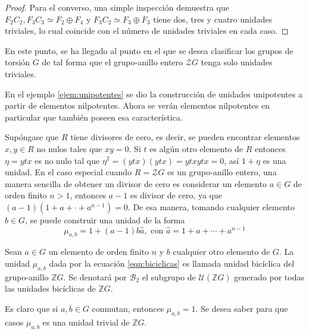 \begin{proof}
Para el converso, una simple inspección demuestra que $F_2C_2, F_3C_3 \simeq F_2\oplus F_4$ y $F_3C_2 \simeq F_3 \oplus F_3$ tiene dos, tres y cuatro unidades triviales, lo cual coincide con el número de unidades triviales en cada caso. 
\end{proof}

En este punto, se ha llegado al punto en el que se desea clasificar los grupos de torsión $G$ de tal forma que el grupo-anillo entero $\mathcal{Z}G$ tenga solo unidades triviales.

\begin{ejemplo}
En el ejemplo \ref{ejem:unipotentes} se dio la construcción de unidades unipotentes a partir de elementos nilpotentes. Ahora se verán elementos nilpotentes en particular que también poseen esa característica. 

Supóngase que $R$ tiene divisores de cero, es decir, se pueden encontrar elementos $x,y \in R$ no nulos tales que $xy = 0$. Si $t$ es algún otro elemento de $R$ entonces $\eta =ytx$ es no nulo tal que $\eta ^2 = (ytx)(ytx) = ytxytx = 0$, así $1+\eta$ es una unidad. En el caso especial cuando $R =\mathcal{Z}G$ es un grupo-anillo entero, una manera sencilla de obtener un divisor de cero es considerar un elemento $a \in G$ de orden finito $ n >1$, entonces $a-1$ es divisor de cero, ya que $(a-1)(1+a+\cdot+a^{n-1})=0$. De esa manera, tomando cualquier elemento $b \in G$, se puede construir una unidad de la forma 
\begin{equation}\label{eqn:biciclicas}
\mu_{a,b} = 1+(a-1)b\hat{a}, \mbox{ con } \hat{a} = 1+a+\cdots+a^{n-1}
\end{equation}
\end{ejemplo}

\begin{definicion}
Sean $a \in G$ un elemento de orden finito $n$ y $b$ cualquier otro elemento de $G$. La unidad $\mu_{a,b}$ dada por la ecuación \ref{eqn:biciclicas} es llamada unidad bicíclica del grupo-anillo $\mathds{Z}G$. Se denotará por $\mathcal{B}_2$ el subgrupo de $\mathcal{U}(\mathds{Z}G)$ generado por todas las unidades bicíclicas de $\mathds{Z}G$.
\end{definicion}

Es claro que si $a,b \in G$ conmutan, entonces $\mu_{a,b} = 1$. Se desea saber para que casos $\mu_{a,b}$ es una unidad trivial de $\mathds{Z}G$.

